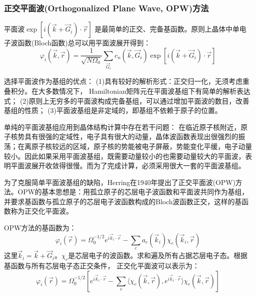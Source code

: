 \subsubsection{正交平面波(Orthogonalized Plane Wave, OPW)方法}
平面波$\exp[i(\vec k+\vec G_i)\cdot\vec r]$ 是最简单的正交、完备基函数。原则上晶体中单电子波函数(Bloch函数)总可以用平面波展开得到：
\begin{equation}
  \varphi_i(\vec k,\vec r)=\frac1{\sqrt{N\Omega_0}}\sum_{\vec G_i}c_n(\vec k,\vec G_i)\exp[i(\vec k+\vec G_i)\cdot\vec r]
  \label{eq:solid-84}
\end{equation}

选择平面波作为基组的优点：
(1)具有较好的解析形式：正交归一化，无须考虑重叠积分。在大多数情况下， Hamiltonian矩阵元在平面波基组下有简单的解析表达式；
(2)原则上无穷多的平面波构成完备基组，可以通过增加平面波的数目，改善基组的性质；
(3)平面波基组是非定域的，即基组不依赖于原子的位置。

单纯的平面波基组应用到晶体结构计算中存在若干问题：%
在临近原子核附近，原子核势具有很强的定域性，电子具有很大的动量，晶体波函数表现出很强烈的振荡；在离原子核较远的区域，原子核的势能被电子屏蔽，势能变化平缓，电子动量较小。因此如果采用平面波基组，既需要动量较小的也需要动量较大的平面波，表明平面波展开收敛得很慢。而为了完成计算，必须采用很大一套的平面波基组。

为了克服简单平面波基组的缺陷，Herring在1940年提出了正交平面波(OPW)方法\cite{PR57-1169_1940}。OPW的基本思想是：用孤立原子的芯层电子波函数和平面波共同作为基组，并要求基函数与孤立原子的芯层电子波函数构成的Bloch波函数正交，这样的基函数称为正交化平面波。

OPW方法的基函数为：
\begin{equation}
  \varphi_i(\vec r)=\Omega_0^{-1/2}e^{i\vec k_i\cdot\vec r}-\sum_ca_c(\vec k_i)\chi_c(\vec k_i,\vec r)
  \label{eq:OPW-set}
\end{equation}
这里$\vec k_i=\vec k+\vec G_i$。$\chi_c$是芯层电子的波函数。求和遍及所有占据芯层电子态。根据基函数与所有芯层电子态正交条件，
正交化平面波可以表示为：
\begin{equation}
  \varphi_i(\vec r)=\Omega_0^{-1/2}\left[e^{i\vec k_i\cdot\vec r}-\sum_c\langle\chi_c(\vec k,\vec r),e^{i\vec k_i\cdot\vec r}\rangle\chi_c(\vec k,\vec r)\right]
  \label{eq:solid-85}
\end{equation}

